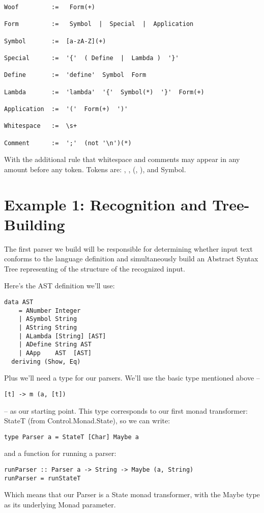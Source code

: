 \documentclass{tmr}
\begin{document}
\begin{verbatim}
Woof         :=   Form(+)

Form         :=   Symbol  |  Special  |  Application

Symbol       :=  [a-zA-Z](+)

Special      :=  '{'  ( Define  |  Lambda )  '}'

Define       :=  'define'  Symbol  Form

Lambda       :=  'lambda'  '{'  Symbol(*)  '}'  Form(+)

Application  :=  '('  Form(+)  ')'

Whitespace   :=  \s+

Comment      :=  ';'  (not '\n')(*)
\end{verbatim}
With the additional rule that whitespace and comments may appear in any 
amount before any token.  Tokens are:  {, }, (, ), and Symbol.



\section{Example 1: Recognition and Tree-Building}
The first parser we build will be responsible for determining whether input
text conforms to the language definition and simultaneously build an 
Abstract Syntax Tree representing of the structure of the recognized input.

Here's the AST definition we'll use:
\begin{verbatim}
data AST
    = ANumber Integer
    | ASymbol String
    | AString String
    | ALambda [String] [AST]
    | ADefine String AST
    | AApp    AST  [AST]
  deriving (Show, Eq)
\end{verbatim}
Plus we'll need a type for our parsers.  We'll use the basic type mentioned 
above -- \begin{verbatim}[t] -> m (a, [t]) \end{verbatim}
 -- as our starting point.  This type corresponds to our first monad transformer:  
 StateT (from Control.Monad.State), so we can write:
\begin{verbatim}
type Parser a = StateT [Char] Maybe a
\end{verbatim}
and a function for running a parser:
\begin{verbatim}
runParser :: Parser a -> String -> Maybe (a, String)
runParser = runStateT
\end{verbatim}
Which means that our Parser is a State monad transformer, with the Maybe type
as its underlying Monad parameter.
\end{document}
